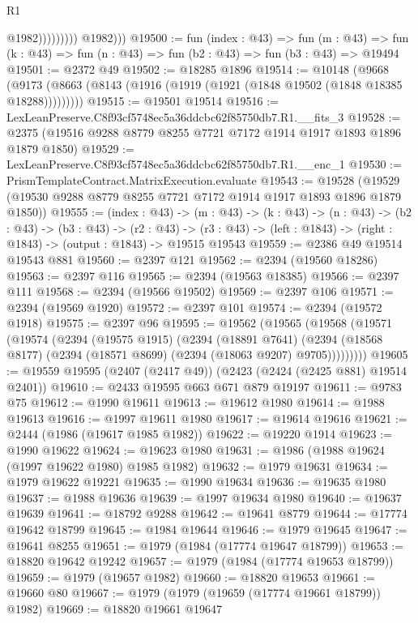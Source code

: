 \begin{lexlean}{R1}
\begin{coremodule}
                            @1982)))))))))
          @1982)))
@19500 := fun (index : @43) =>
  fun (m : @43) => fun (k : @43) => fun (n : @43) => fun (b2 : @43) => fun (b3 : @43) => @19494
@19501 := @2372 @49
@19502 := @18285 @1896
@19514 := @10148
    (@9668 (@9173 (@8663 (@8143 (@1916 (@1919 (@1921 (@1848 @19502 (@1848 @18385 @18288)))))))))
@19515 := @19501 @19514
@19516 := LexLeanPreserve.C8f93cf5748ec5a36ddcbc62f85750db7.R1.__fits_3
@19528 := @2375 (@19516 @9288 @8779 @8255 @7721 @7172 @1914 @1917 @1893 @1896 @1879 @1850)
@19529 := LexLeanPreserve.C8f93cf5748ec5a36ddcbc62f85750db7.R1.__enc_1
@19530 := PrismTemplateContract.MatrixExecution.evaluate
@19543 := @19528 (@19529 (@19530 @9288 @8779 @8255 @7721 @7172 @1914 @1917 @1893 @1896 @1879 @1850))
@19555 := (index : @43) ->
  (m : @43) ->
  (k : @43) ->
  (n : @43) ->
  (b2 : @43) ->
  (b3 : @43) ->
  (r2 : @43) -> (r3 : @43) -> (left : @1843) -> (right : @1843) -> (output : @1843) -> @19515 @19543
@19559 := @2386 @49 @19514 @19543 @881
@19560 := @2397 @121
@19562 := @2394 (@19560 @18286)
@19563 := @2397 @116
@19565 := @2394 (@19563 @18385)
@19566 := @2397 @111
@19568 := @2394 (@19566 @19502)
@19569 := @2397 @106
@19571 := @2394 (@19569 @1920)
@19572 := @2397 @101
@19574 := @2394 (@19572 @1918)
@19575 := @2397 @96
@19595 := @19562
    (@19565
      (@19568
        (@19571
          (@19574
            (@2394
              (@19575 @1915)
              (@2394
                (@18891 @7641)
                (@2394 (@18568 @8177) (@2394 (@18571 @8699) (@2394 (@18063 @9207) @9705)))))))))
@19605 := @19559 @19595 (@2407 (@2417 @49)) (@2423 (@2424 (@2425 @881) @19514 @2401))
@19610 := @2433 @19595 @663 @671 @879 @19197
@19611 := @9783 @75
@19612 := @1990 @19611
@19613 := @19612 @1980
@19614 := @1988 @19613
@19616 := @1997 @19611 @1980
@19617 := @19614 @19616
@19621 := @2444 (@1986 (@19617 @1985 @1982))
@19622 := @19220 @1914
@19623 := @1990 @19622
@19624 := @19623 @1980
@19631 := @1986 (@1988 @19624 (@1997 @19622 @1980) @1985 @1982)
@19632 := @1979 @19631
@19634 := @1979 @19622 @19221
@19635 := @1990 @19634
@19636 := @19635 @1980
@19637 := @1988 @19636
@19639 := @1997 @19634 @1980
@19640 := @19637 @19639
@19641 := @18792 @9288
@19642 := @19641 @8779
@19644 := @17774 @19642 @18799
@19645 := @1984 @19644
@19646 := @1979 @19645
@19647 := @19641 @8255
@19651 := @1979 (@1984 (@17774 @19647 @18799))
@19653 := @18820 @19642 @19242
@19657 := @1979 (@1984 (@17774 @19653 @18799))
@19659 := @1979 (@19657 @1982)
@19660 := @18820 @19653
@19661 := @19660 @80
@19667 := @1979 (@1979 (@19659 (@17774 @19661 @18799)) @1982)
@19669 := @18820 @19661 @19647

\end{coremodule}
\end{lexlean}

